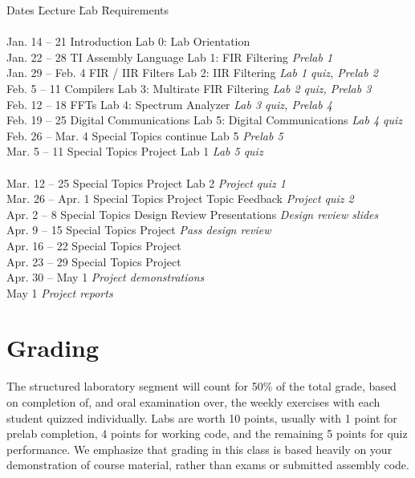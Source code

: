 \documentclass[11pt]{handout}
\begin{document}
\begin{tabbing}
Dates \hspace{.75in} \= Lecture \hspace{1.3in} \= Lab \hspace{2.0in}
\= Requirements\\
 \\
Jan. 14 -- 21 \> Introduction \> Lab 0: Lab Orientation\\
Jan. 22 -- 28 \> TI Assembly Language \> Lab 1: FIR Filtering \>
{\em Prelab 1} \\
Jan. 29 -- Feb. 4 \> FIR / IIR Filters \> Lab 2: IIR Filtering \>
{\em Lab 1 quiz, Prelab 2} \\
Feb. 5 -- 11 \> Compilers \> Lab 3: Multirate FIR Filtering \>
{\em Lab 2 quiz, Prelab 3} \\
Feb. 12 -- 18\> FFTs \> Lab 4: Spectrum Analyzer\>
{\em Lab 3 quiz, Prelab 4}  \\
Feb. 19 -- 25 \> Digital Communications \> 
Lab 5: Digital Communications \>
{\em Lab 4 quiz}  \\
Feb. 26 -- Mar. 4 \> Special Topics \> continue Lab 5 \> {\em Prelab 5} \\

Mar. 5 -- 11 \> Special Topics \> Project Lab 1\>
{\em Lab 5 quiz} \\
\> \> \\
Mar. 12 -- 25 \> Special Topics \> Project Lab 2 \> {\em Project quiz 1}\\
Mar. 26 -- Apr. 1 \> Special Topics \> Project Topic Feedback \>
{\em Project quiz 2} \\
Apr. 2 -- 8 \> Special Topics \> Design Review Presentations \>
{\em Design review slides} \\
Apr. 9 -- 15 \> Special Topics \> Project \> {\em Pass design review}\\
Apr. 16 -- 22 \> Special Topics \> Project \\
Apr. 23 -- 29 \>  Special Topics \> Project \\
Apr. 30 -- May 1 \> \> \> {\em Project demonstrations}\\
May 1 \> \> \> {\em Project reports}\\
\end{tabbing}

\section{Grading}

The structured laboratory segment will count for
50\% of the total grade, based on completion of, and oral examination
over, the weekly exercises with each student quizzed individually.
Labs are worth 10 points, usually with 1 point for prelab completion,
4 points for working code, and the remaining 5 points
for quiz performance.
We emphasize that grading in this class is based heavily
on your demonstration of course material, rather than
exams or submitted assembly code.
\end{document}
